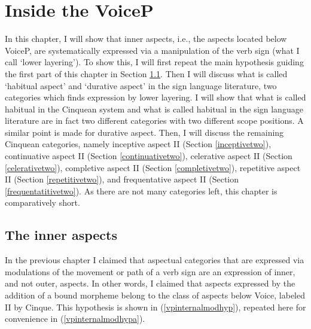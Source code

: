 \chapter{Inside the VoiceP}\label{insidevp}
In this chapter, I will show that inner aspects, i.e., the aspects located below VoiceP, are systematically expressed via a manipulation of the verb sign (what I call `lower layering'). To show this, I will first repeat the main hypothesis guiding the first part of this chapter in Section \ref{inneraspects}. Then I will discuss what is called `habitual aspect' and `durative aspect' in the sign language literature, two categories which finds expression by lower layering. I will show that what is called habitual in the Cinquean system and what is called habitual in the sign language literature are in fact two different categories with two different scope positions. A similar point is made for durative aspect. Then, I will discuss the remaining Cinquean categories, namely inceptive aspect II (Section \ref{inceptivetwo}), continuative aspect II (Section \ref{continuativetwo}), celerative aspect II (Section \ref{celerativetwo}), completive aspect II (Section \ref{completivetwo}), repetitive aspect II (Section \ref{repetitivetwo}), and frequentative aspect II (Section \ref{frequentatitivetwo}). As there are not many categories left, this chapter is comparatively short. 


\largerpage
\section{The inner aspects}\label{inneraspects}

In the previous chapter I claimed that aspectual categories that are expressed via modulations of the movement or path of a verb sign are an expression of inner, and not outer, aspects. In other words, I claimed that aspects expressed by the addition of a bound morpheme belong to the class of aspects below Voice, labeled II by Cinque. This hypothesis is shown in (\ref{vpinternalmodhyp}), repeated here for convenience in (\ref{vpinternalmodhypa}).

